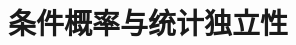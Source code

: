 \documentclass[../main.tex]{subfiles}
\begin{document}
\chapter{条件概率与统计独立性}\label{chapter:ch02-条件概率与统计独立性}







\end{document}
